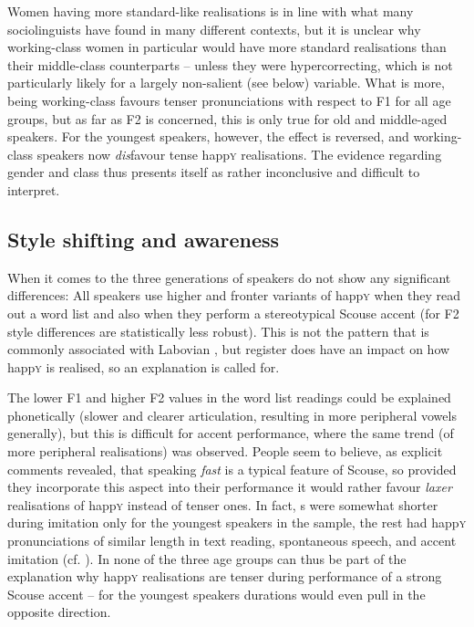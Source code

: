 Women having more standard-like realisations is in line with what many sociolinguists have found in many different contexts, but it is unclear why working-class women in particular would have more standard realisations than their mid\-dle-class counterparts -- unless they were hypercorrecting, which is not particularly likely for a largely non-salient (see below) variable.
What is more, being working-class favours tenser pronunciations with respect to F1 for all age groups, but as far as F2 is concerned, this is only true for old and middle-aged speakers.
For the youngest speakers, however, the effect is reversed, and working-class speakers now \emph{dis}favour tense happ\textsc{y} realisations.
The evidence regarding gender and class thus presents itself as rather inconclusive and difficult to interpret.

\subsection{Style shifting and awareness}
\label{prod.disc.happy.style}

When it comes to  the three generations of speakers do not show any significant differences: All speakers use higher and fronter variants of happ\textsc{y} when they read out a word list and also when they perform a stereotypical Scouse accent (for F2 style differences are statistically less robust).
This is not the pattern that is commonly associated with Labovian , but register does have an impact on how happ\textsc{y} is realised, so an explanation is called for.

The lower F1 and higher F2 values in the word list readings could be explained phonetically (slower and clearer articulation, resulting in more peripheral vowels generally), but this is difficult for accent performance, where the same trend (of more peripheral realisations) was observed.
People seem to believe, as explicit comments revealed, that speaking \emph{fast} is a typical feature of Scouse, so provided they incorporate this aspect into their  performance it would rather favour \emph{laxer} realisations of happ\textsc{y} instead of tenser ones.
In fact, s were somewhat shorter during imitation only for the youngest speakers in the sample, the rest had happ\textsc{y} pronunciations of similar length in text reading, spontaneous speech, and accent imitation (cf. ).
In none of the three age groups can  thus be part of the explanation why happ\textsc{y} realisations are tenser during performance of a strong Scouse accent -- for the youngest speakers durations would even pull in the opposite direction.

